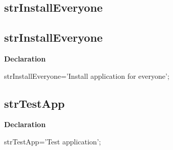 \documentclass{report}
\newif\ifpdf
\begin{document}
\subsection*{\large{\textbf{strInstallEveryone}}\normalsize\hspace{1ex}\hrulefill}
\else
\subsection*{strInstallEveryone}
\fi
\label{trstrings-strInstallEveryone}
\begin{list}{}{
\setlength{\itemindent}{0cm}
\setlength{\listparindent}{0cm}
\setlength{\leftmargin}{\evensidemargin}
\addtolength{\leftmargin}{\tmplength}
\settowidth{\labelsep}{X}
\addtolength{\leftmargin}{\labelsep}
\setlength{\labelwidth}{\tmplength}
}
\item[\textbf{Declaration}\hfill]
\ifpdf
\begin{flushleft}
\fi
\begin{ttfamily}
strInstallEveryone='Install application for everyone';\end{ttfamily}

\ifpdf
\end{flushleft}
\fi

\end{list}
\ifpdf
\subsection*{\large{\textbf{strTestApp}}\normalsize\hspace{1ex}\hrulefill}
\else
\subsection*{strTestApp}
\fi
\label{trstrings-strTestApp}
\begin{list}{}{
\setlength{\itemindent}{0cm}
\setlength{\listparindent}{0cm}
\setlength{\leftmargin}{\evensidemargin}
\addtolength{\leftmargin}{\tmplength}
\settowidth{\labelsep}{X}
\addtolength{\leftmargin}{\labelsep}
\setlength{\labelwidth}{\tmplength}
}
\item[\textbf{Declaration}\hfill]
\ifpdf
\begin{flushleft}
\fi
\begin{ttfamily}
strTestApp='Test application';\end{ttfamily}

\ifpdf
\end{flushleft}
\fi

\end{list}
\ifpdf
\end{document}
